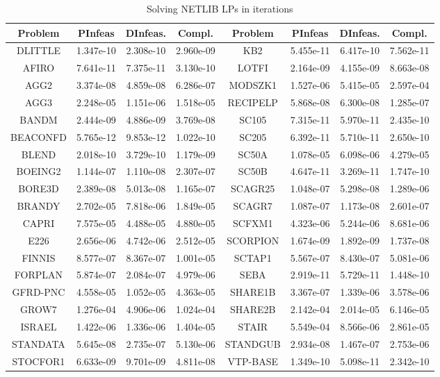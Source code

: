 \documentclass{article}
\newcommand{\tmcolor}[2]{{\color{#1}{#2}}}
\newcommand{\tmtextbf}[1]{\text{{\bfseries{#1}}}}
\newcommand{\0}{\textbf{0}}
\begin{document}
\begin{table}[h]
  {\small{\begin{tabular}{cccc|c|ccc}
    \hline
    Problem & PInfeas & DInfeas. & Compl. & Problem & PInfeas & DInfeas. &
    Compl.\\
    \hline
    DLITTLE & 1.347e-10 & 2.308e-10 & 2.960e-09 & KB2 & 5.455e-11 & 6.417e-10
    & 7.562e-11\\
    \hline
    AFIRO & 7.641e-11 & 7.375e-11 & 3.130e-10 & LOTFI & 2.164e-09 & 4.155e-09
    & 8.663e-08\\
    \hline
    AGG2 & 3.374e-08 & 4.859e-08 & 6.286e-07 & MODSZK1 & 1.527e-06 & 5.415e-05
    & 2.597e-04\\
    \hline
    AGG3 & 2.248e-05 & 1.151e-06 & 1.518e-05 & RECIPELP & 5.868e-08 &
    6.300e-08 & 1.285e-07\\
    \hline
    BANDM & 2.444e-09 & 4.886e-09 & 3.769e-08 & SC105 & 7.315e-11 & 5.970e-11
    & 2.435e-10\\
    \hline
    BEACONFD & 5.765e-12 & 9.853e-12 & 1.022e-10 & SC205 & 6.392e-11 &
    5.710e-11 & 2.650e-10\\
    \hline
    BLEND & 2.018e-10 & 3.729e-10 & 1.179e-09 & SC50A & 1.078e-05 & 6.098e-06
    & 4.279e-05\\
    \hline
    BOEING2 & 1.144e-07 & 1.110e-08 & 2.307e-07 & SC50B & 4.647e-11 &
    3.269e-11 & 1.747e-10\\
    \hline
    BORE3D & 2.389e-08 & 5.013e-08 & 1.165e-07 & SCAGR25 & 1.048e-07 &
    5.298e-08 & 1.289e-06\\
    \hline
    BRANDY & 2.702e-05 & 7.818e-06 & 1.849e-05 & SCAGR7 & 1.087e-07 &
    1.173e-08 & 2.601e-07\\
    \hline
    CAPRI & 7.575e-05 & 4.488e-05 & 4.880e-05 & SCFXM1 & 4.323e-06 & 5.244e-06
    & 8.681e-06\\
    \hline
    E226 & 2.656e-06 & 4.742e-06 & 2.512e-05 & SCORPION & 1.674e-09 &
    1.892e-09 & 1.737e-08\\
    \hline
    FINNIS & 8.577e-07 & 8.367e-07 & 1.001e-05 & SCTAP1 & 5.567e-07 &
    8.430e-07 & 5.081e-06\\
    \hline
    FORPLAN & 5.874e-07 & 2.084e-07 & 4.979e-06 & SEBA & 2.919e-11 & 5.729e-11
    & 1.448e-10\\
    \hline
    GFRD-PNC & 4.558e-05 & 1.052e-05 & 4.363e-05 & SHARE1B & 3.367e-07 &
    1.339e-06 & 3.578e-06\\
    \hline
    GROW7 & 1.276e-04 & 4.906e-06 & 1.024e-04 & SHARE2B & 2.142e-04 &
    2.014e-05 & 6.146e-05\\
    \hline
    ISRAEL & 1.422e-06 & 1.336e-06 & 1.404e-05 & STAIR & 5.549e-04 & 8.566e-06
    & 2.861e-05\\
    \hline
    STANDATA & 5.645e-08 & 2.735e-07 & 5.130e-06 & STANDGUB & 2.934e-08 &
    1.467e-07 & 2.753e-06\\
    \hline
    STOCFOR1 & 6.633e-09 & 9.701e-09 & 4.811e-08 & VTP-BASE & 1.349e-10 &
    5.098e-11 & 2.342e-10\\
    \hline
  \end{tabular}}}
  \caption{Solving NETLIB LPs in \tmcolor{red}{\tmtextbf{1000}} iterations}
\end{table}
\end{document}
